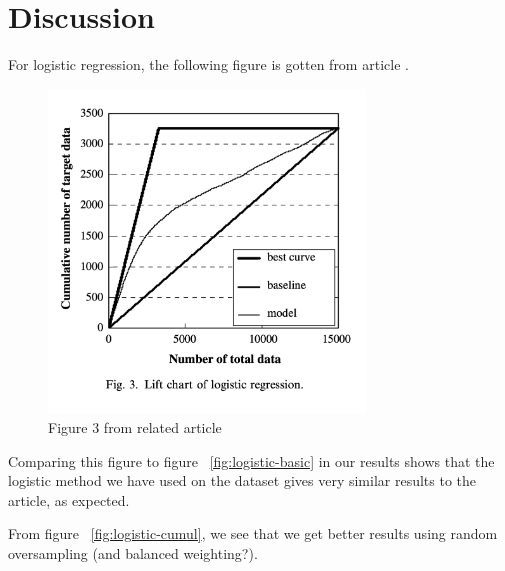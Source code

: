 \section{Discussion}

For logistic regression, the following figure is gotten from 
article \cite{ComparisonData}. 

\begin{figure}[H]
\begin{center}
    \includegraphics[width=0.75\textwidth, height=0.5\textheight]{figures/logistic_article.png}
\end{center}
\caption[caption]{Figure 3 from related article ~\cite{ComparisonData}}
\end{figure}

Comparing this figure to figure ~\ref{fig:logistic-basic} in our 
results shows that the logistic method we have used on the 
dataset gives very similar results to the article, as expected. 

From figure ~\ref{fig:logistic-cumul}, we see that we get 
better results using random oversampling (and balanced weighting?). 

